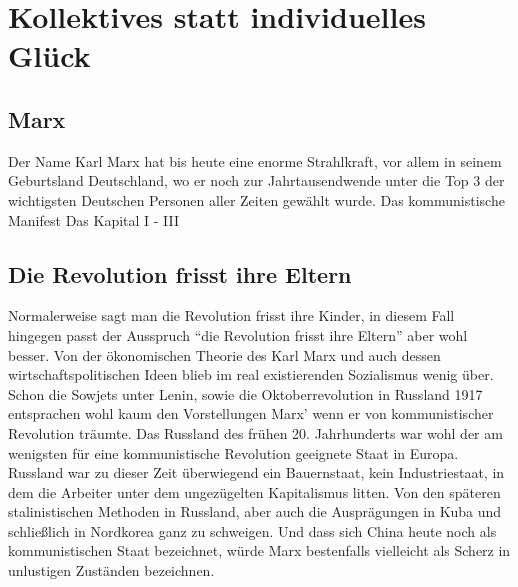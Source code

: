 %
%
%

\chapter{Kollektives statt individuelles Glück}
\label{Marx}

\section{Marx}
Der Name Karl Marx hat bis heute eine enorme Strahlkraft, vor allem in seinem Geburtsland Deutschland, wo er noch zur Jahrtausendwende unter die Top 3 der wichtigsten Deutschen Personen aller Zeiten gewählt wurde. 
Das kommunistische Manifest
Das Kapital I - III

\section{Die Revolution frisst ihre Eltern}
\label{cha: Moderner Sozialismus}
Normalerweise sagt man die Revolution frisst ihre Kinder, in diesem Fall hingegen passt der Ausspruch "`die Revolution frisst ihre Eltern"' aber wohl besser. Von der ökonomischen Theorie des Karl Marx und auch dessen wirtschaftspolitischen Ideen blieb im real existierenden Sozialismus wenig über. Schon die Sowjets unter Lenin, sowie die Oktoberrevolution in Russland 1917 entsprachen wohl kaum den Vorstellungen Marx' wenn er von kommunistischer Revolution träumte. Das Russland des frühen 20. Jahrhunderts war wohl der am wenigsten für eine kommunistische Revolution geeignete Staat in Europa. Russland war zu dieser Zeit überwiegend ein Bauernstaat, kein Industriestaat, in dem die Arbeiter unter dem ungezügelten Kapitalismus litten. Von den späteren stalinistischen Methoden in Russland, aber auch die Ausprägungen in Kuba und schließlich in Nordkorea ganz zu schweigen. Und dass sich China heute noch als kommunistischen Staat bezeichnet, würde Marx bestenfalls vielleicht als Scherz in unlustigen Zuständen bezeichnen.